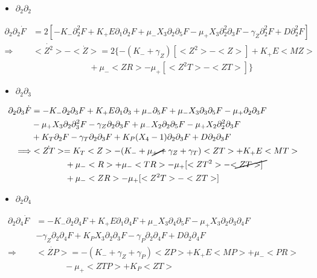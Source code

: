 \documentclass{article}
\begin{document}
\begin{itemize}
    \item $\partial_2\partial_2$
\end{itemize}
\begin{align*}
    \partial_2\partial_2\Dot{F} &= 2[-K_-\partial_2^2F + K_+E\partial_1\partial_2F + \mu_-X_3\partial_2\partial_5F - \mu_+X_3\partial_2^2\partial_3F - \gamma_Z\partial_2^2F + D\partial_2^2F]\\
    \Longrightarrow & <\Dot{Z^2}> - <\Dot{Z}> = 2\{-(K_- + \gamma_Z)[<Z^2>-<Z>] + K_+E<MZ> \\
    &\hspace{80pt}+ \mu_-<ZR> - \mu_+[<Z^2T> - <ZT>]\}
\end{align*}

\begin{itemize}
    \item $\partial_2\partial_3$
\end{itemize}
\begin{align*}
    \partial_2\partial_3\Dot{F} &= -K_-\partial_2\partial_3F + K_+E\partial_1\partial_3 + \mu_-\partial_5F + \mu_-X_3\partial_3\partial_5F - \mu_+\partial_2\partial_3F\\
                                &- \mu_+X_3\partial_2\partial_3^2F - \gamma_Z\partial_2\partial_3F + \mu_-X_2\partial_2\partial_5F - \mu_+X_2\partial_2^2\partial_3F\\
                                &+ K_T\partial_2F - \gamma_T\partial_2\partial_3F + K_P(X_4-1)\partial_2\partial_3F + D\partial_2\partial_3F\\
            \Longrightarrow     &<\Dot{ZT}> = K_T<Z> - (K_- + \cancel{\mu_+} + \gamma_Z + \gamma_T)<ZT> + K_+E<MT> \\
                                & \hspace{40pt} + \mu_-<R> + \mu_-<TR> - \mu_+[<ZT^2>-\cancel{<ZT>}]\\
                                & \hspace{40pt} + \mu_-<ZR> - \mu_+[<Z^2T>-<ZT>]
\end{align*}

\begin{itemize}
    \item $\partial_2\partial_4$
\end{itemize}
\begin{align*}
    \partial_2\partial_4\Dot{F} &= -K_-\partial_2\partial_4F + K_+E\partial_1\partial_4F + \mu_-X_3\partial_4\partial_5F - \mu_+X_3\partial_2\partial_3\partial_4F\\
                                &- \gamma_Z\partial_2\partial_4F + K_PX_3\partial_2\partial_3F - \gamma_P\partial_2\partial_4F + D\partial_2\partial_4F\\
                \Longrightarrow & <\Dot{ZP}> = -(K_- + \gamma_Z + \gamma_P)<ZP> + K_+E<MP> + \mu_-<PR>\\
                                & \hspace{40pt} - \mu_+<ZTP> + K_P<ZT>
\end{align*}
\end{document}
